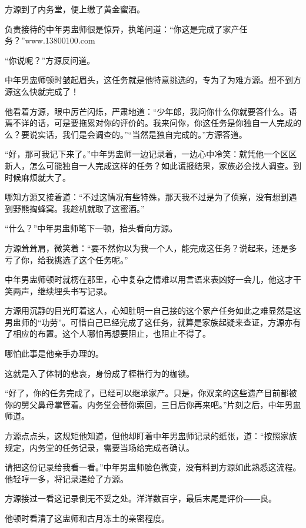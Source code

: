 
\begin{this_body}

方源到了内务堂，便上缴了黄金蜜酒。

负责接待的中年男盅师很是惊异，执笔问道：“你这是完成了家产任务？”www.13800100.com

“你说呢？”方源反问道。

中年男盅师顿时皱起眉头，这任务就是他特意挑选的，专为了为难方源。想不到方源这么快就完成了！

他看着方源，眼中厉芒闪烁，严肃地道：“少年郎，我问你什么你就要答什么。语焉不详的话，可是要拖累对你的评价的。我来问你，你这任务是你独自一人完成的么？要说实话，我们是会调查的。”“当然是独自完成的。”方源答道。

“好，那可我记下来了。”中年男盅师一边记录着，一边心中冷笑：就凭他一个区区新人，怎么可能独自一人完成这样的任务？如此谎报结果，家族必会找人调查。到时候麻烦就大了。

哪知方源又接着道：“不过这情况有些特殊，那天我不过是为了侦察，没有想到遇到野熊掏蜂窝。我趁机就取了这蜜酒。”

“什么？”中年男盅师笔下一顿，抬头看向方源。

方源耸耸肩，微笑着：“要不然你以为我一个人，能完成这任务？说起来，还是多亏了你，给我挑选了这个任务呢。”

中年男盅师顿时就楞在那里，心中复杂之情难以用言语来表凶好一会儿，他这才干笑两声，继续埋头书写记录。

方源用沉静的目光盯着这人，心知肚明一自己接的这个家产任务如此之难显然是这男盅师的“功劳”。可惜自己已经完成了这任务，就算是家族起疑来查证，方源亦有了相应的布置。这个人哪怕再想要阻止，也阻止不得了。

哪怕此事是他亲手办理的。

这就是入了体制的悲哀，身份成了桎梏行为的枷锁。

“好了，你的任务完成了，已经可以继承家产。只是，你双亲的这些遗产目前都被你的舅父鼻母掌管着。内务堂会替你索回，三日后你再来吧。”片刻之后，中年男盅师道。

方源点点头，这规矩他知道，但他却盯着中年男盅师记录的纸张，道：“按照家族规定，内务堂的任务记录，需要当场给完成者确认。

请把这份记录给我看一看。”中年男盅师脸色微变，没有料到方源如此熟悉这流程。他轻哼一多，将记录递给了方源。

方源接过一看这记录倒无不妥之处。洋洋数百字，最后末尾是评价――良。

他顿时看清了这盅师和古月冻土的亲密程度。


\end{this_body}

